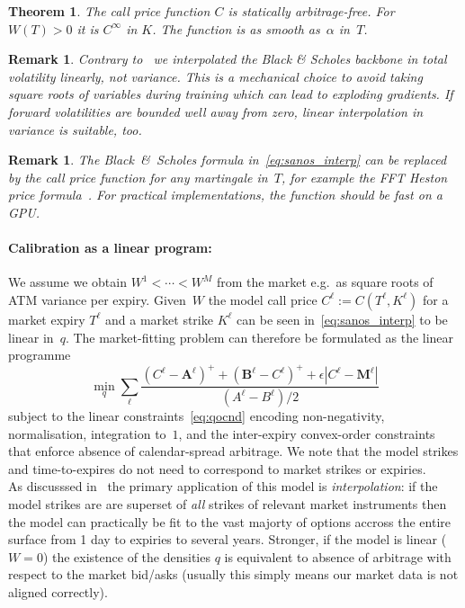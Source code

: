 \documentclass[11pt,a4paper]{article}
\newtheorem{theorem}[definition]{Theorem}
\newtheorem{remark}[definition]{Remark}
\begin{document}
\begin{theorem}
    The call price function $C$ is statically arbitrage-free.
For $W(T)>0$ it is $C^\infty$ in $K$. The function is as smooth as~$\alpha$ in~$T$.
\end{theorem}

\begin{remark}
    Contrary to~\cite{SANOS2026} we interpolated the Black \& Scholes backbone in total volatility linearly, not variance.
    This is a mechanical choice to avoid taking square roots of variables during training
    which can lead to exploding gradients. If forward volatilities are bounded well away from
    zero, linear interpolation in variance is suitable, too.
\end{remark}

\begin{remark}
    The Black~\&~Scholes formula in~\eqref{eq:sanos_interp} can be replaced
    by the call price function for any martingale in~$T$, for example the FFT Heston price formula~\cite{carrmadan1999}.
    For practical implementations, the
    function should be fast on a GPU.
\end{remark}

\paragraph{Calibration as a linear program:}
 We assume we obtain $W^1<\cdots<W^M$
from the market e.g.~as square roots of ATM variance per expiry.
Given~$W$ the model call price $C^\ell := C(T^\ell, K^\ell)$ for a market expiry $T^\ell$ and
a market strike $K^\ell$
can be seen in~\eqref{eq:sanos_interp}
to be linear in~$q$.
The market-fitting problem can therefore be formulated as the linear programme
\begin{equation}
  \label{eq:lp}
  \min_{q} \sum_\ell \frac{
    (C^\ell - \bm{A}^\ell)^+ + (\bm{B}^\ell - C^\ell)^+ + \epsilon |C^\ell - \bm{M}^\ell|
  }{ (A^\ell - B^\ell)/2}
\end{equation}
subject to the linear constraints~\eqref{eq:qocnd} encoding non-negativity, normalisation, integration to~$1$, and the inter-expiry convex-order constraints that enforce absence of calendar-spread
arbitrage. We note that the model strikes and time-to-expires do not need to correspond
to market strikes or expiries.\\

As discusssed in~\cite{SANOS2026} the primary application of this model is \emph{interpolation}: if the model strikes
are are superset of \emph{all} strikes of relevant market instruments then the model can practically be fit to the
vast majorty of options accross the entire surface from 1 day to expiries to several years. Stronger, if the model is
linear ($W=0$) the existence of the densities $q$ is equivalent to absence of arbitrage with respect to the market bid/asks (usually
this simply means our market data is not aligned correctly).
\end{document}
